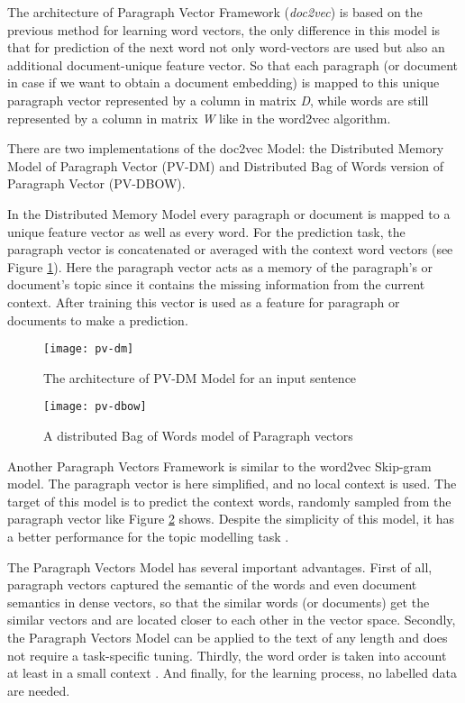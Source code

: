 \documentclass[fontsize=12pt,a4paper,twoside,openany]{scrbook}
\begin{document}
The architecture of Paragraph Vector Framework (\emph{doc2vec}) is based on the previous method for learning word vectors, the only difference in this model is that for prediction of the next word not only word-vectors are used but also an additional document-unique feature vector. So that each paragraph (or document in case if we want to obtain a document embedding) is mapped to this unique paragraph vector represented by a column in matrix \emph{D}, while words are still represented by a column in matrix \emph{W} like in the word2vec algorithm. 

There are two implementations of the doc2vec Model: the Distributed Memory Model of Paragraph Vector (PV-DM) and Distributed Bag of Words version of Paragraph Vector (PV-DBOW).

In the Distributed Memory Model every paragraph or document is mapped to a unique feature vector as well as every word. For the prediction task, the paragraph vector is concatenated or averaged with the context word vectors (see Figure \ref{fig:pv-dm}). Here the paragraph vector acts as a memory of the paragraph's or document's topic since it contains the missing information from the current context. After training this vector is used as a feature for paragraph or documents to make a prediction.

\begin{figure}[!ht]
\centering
\texttt{[image: pv-dm]}
\caption{The architecture of PV-DM Model for an input sentence}
\label{fig:pv-dm}
\end{figure}

\begin{figure}[!ht]
\centering
\texttt{[image: pv-dbow]}
\caption{A distributed Bag of Words model of Paragraph vectors}
\label{fig:pv-dbow}
\end{figure}

Another Paragraph Vectors Framework is similar to the word2vec Skip-gram model. The paragraph vector is here simplified, and no local context is used. The target of this model is to predict the context words, randomly sampled from the paragraph vector \parencite{Le14} like Figure \ref{fig:pv-dbow} shows. Despite the simplicity of this model, it has a better performance for the topic modelling task \parencite{Angelov20}.

The Paragraph Vectors Model has several important advantages. First of all, paragraph vectors captured the semantic of the words and even document semantics in dense vectors, so that the similar words (or documents) get the similar vectors and are located closer to each other in the vector space. Secondly, the Paragraph Vectors Model can be applied to the text of any length and does not require a task-specific tuning. Thirdly, the word order is taken into account at least in a small context \parencite{Dai15}. And finally, for the learning process, no labelled data are needed. 
\end{document}
